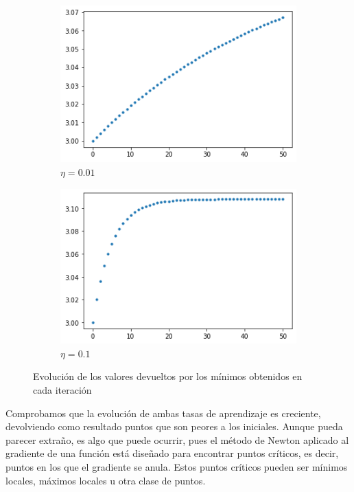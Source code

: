 \documentclass[10pt,a4paper]{article}
\begin{document}
\begin{figure}[h]
	\begin{subfigure}{0.5\textwidth}
		\centering
		\includegraphics[width=\textwidth]{bonus_evolucion_eta0.01}
		\caption{$\eta = 0.01$}
	\end{subfigure}
	\begin{subfigure}{0.5\textwidth}
		\centering
		\includegraphics[width=\textwidth]{bonus_evolucion_eta0.1}
		\caption{$\eta = 0.1$}
	\end{subfigure}
	\caption{Evolución de los valores devueltos por los mínimos obtenidos en cada iteración}
	\label{fig:bonus_evolucion}
\end{figure}

Comprobamos que la evolución de ambas tasas de aprendizaje es creciente, devolviendo como resultado puntos que son peores a los iniciales. Aunque pueda parecer extraño, es algo que puede ocurrir, pues el método de Newton aplicado al gradiente de una función está diseñado para encontrar puntos críticos, es decir, puntos en los que el gradiente se anula. Estos puntos críticos pueden ser mínimos locales, máximos locales u otra clase de puntos.
\end{document}
